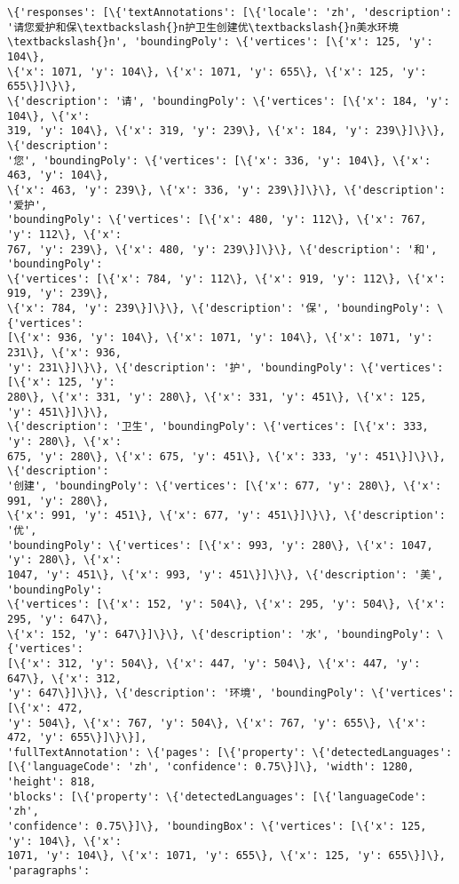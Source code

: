 \documentclass[11pt]{article}
\begin{document}
    \begin{Verbatim}[commandchars=\\\{\}]
\{'responses': [\{'textAnnotations': [\{'locale': 'zh', 'description':
'请您爱护和保\textbackslash{}n护卫生创建优\textbackslash{}n美水环境\textbackslash{}n', 'boundingPoly': \{'vertices': [\{'x': 125, 'y': 104\},
\{'x': 1071, 'y': 104\}, \{'x': 1071, 'y': 655\}, \{'x': 125, 'y': 655\}]\}\},
\{'description': '请', 'boundingPoly': \{'vertices': [\{'x': 184, 'y': 104\}, \{'x':
319, 'y': 104\}, \{'x': 319, 'y': 239\}, \{'x': 184, 'y': 239\}]\}\}, \{'description':
'您', 'boundingPoly': \{'vertices': [\{'x': 336, 'y': 104\}, \{'x': 463, 'y': 104\},
\{'x': 463, 'y': 239\}, \{'x': 336, 'y': 239\}]\}\}, \{'description': '爱护',
'boundingPoly': \{'vertices': [\{'x': 480, 'y': 112\}, \{'x': 767, 'y': 112\}, \{'x':
767, 'y': 239\}, \{'x': 480, 'y': 239\}]\}\}, \{'description': '和', 'boundingPoly':
\{'vertices': [\{'x': 784, 'y': 112\}, \{'x': 919, 'y': 112\}, \{'x': 919, 'y': 239\},
\{'x': 784, 'y': 239\}]\}\}, \{'description': '保', 'boundingPoly': \{'vertices':
[\{'x': 936, 'y': 104\}, \{'x': 1071, 'y': 104\}, \{'x': 1071, 'y': 231\}, \{'x': 936,
'y': 231\}]\}\}, \{'description': '护', 'boundingPoly': \{'vertices': [\{'x': 125, 'y':
280\}, \{'x': 331, 'y': 280\}, \{'x': 331, 'y': 451\}, \{'x': 125, 'y': 451\}]\}\},
\{'description': '卫生', 'boundingPoly': \{'vertices': [\{'x': 333, 'y': 280\}, \{'x':
675, 'y': 280\}, \{'x': 675, 'y': 451\}, \{'x': 333, 'y': 451\}]\}\}, \{'description':
'创建', 'boundingPoly': \{'vertices': [\{'x': 677, 'y': 280\}, \{'x': 991, 'y': 280\},
\{'x': 991, 'y': 451\}, \{'x': 677, 'y': 451\}]\}\}, \{'description': '优',
'boundingPoly': \{'vertices': [\{'x': 993, 'y': 280\}, \{'x': 1047, 'y': 280\}, \{'x':
1047, 'y': 451\}, \{'x': 993, 'y': 451\}]\}\}, \{'description': '美', 'boundingPoly':
\{'vertices': [\{'x': 152, 'y': 504\}, \{'x': 295, 'y': 504\}, \{'x': 295, 'y': 647\},
\{'x': 152, 'y': 647\}]\}\}, \{'description': '水', 'boundingPoly': \{'vertices':
[\{'x': 312, 'y': 504\}, \{'x': 447, 'y': 504\}, \{'x': 447, 'y': 647\}, \{'x': 312,
'y': 647\}]\}\}, \{'description': '环境', 'boundingPoly': \{'vertices': [\{'x': 472,
'y': 504\}, \{'x': 767, 'y': 504\}, \{'x': 767, 'y': 655\}, \{'x': 472, 'y': 655\}]\}\}],
'fullTextAnnotation': \{'pages': [\{'property': \{'detectedLanguages':
[\{'languageCode': 'zh', 'confidence': 0.75\}]\}, 'width': 1280, 'height': 818,
'blocks': [\{'property': \{'detectedLanguages': [\{'languageCode': 'zh',
'confidence': 0.75\}]\}, 'boundingBox': \{'vertices': [\{'x': 125, 'y': 104\}, \{'x':
1071, 'y': 104\}, \{'x': 1071, 'y': 655\}, \{'x': 125, 'y': 655\}]\}, 'paragraphs':

\end{Verbatim}
\end{document}

